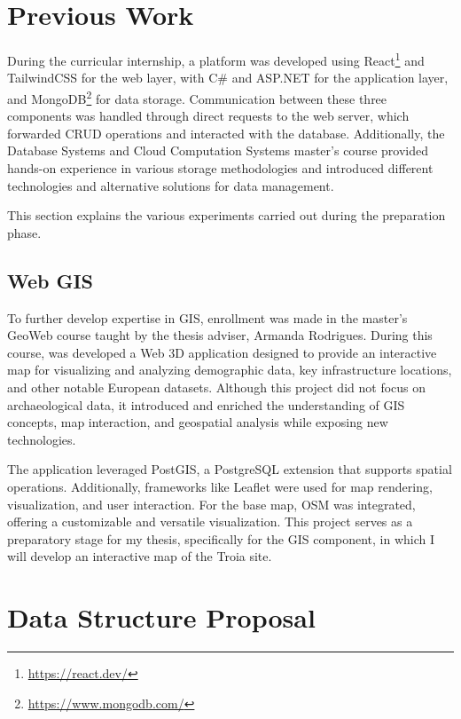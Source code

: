 \section{Previous Work}
\label{sec:previous_work}

During the curricular internship, a platform was developed using React\footnote{\url{https://react.dev/}} and TailwindCSS for the web layer, with C\# and ASP.NET for the application layer, and MongoDB\footnote{\url{https://www.mongodb.com/}} for data storage. Communication between these three components was handled through direct requests to the web server, which forwarded \gls{CRUD} operations and interacted with the database.  
Additionally, the Database Systems and Cloud Computation Systems master's course provided hands-on experience in various storage methodologies and introduced different technologies and alternative solutions for data management.

This section explains the various experiments carried out during the preparation phase.

\subsection{Web \gls{GIS}}
\label{sec:gis_previous} 

To further develop expertise in \gls{GIS}, enrollment was made in the master's GeoWeb course taught by the thesis adviser, Armanda Rodrigues. During this course, was developed a Web \gls{3D} application designed to provide an interactive map for visualizing and analyzing demographic data, key infrastructure locations, and other notable European datasets. Although this project did not focus on archaeological data, it introduced and enriched the understanding of GIS concepts, map interaction, and geospatial analysis while exposing new technologies.

The application leveraged PostGIS, a PostgreSQL extension that supports spatial operations.
Additionally, frameworks like Leaflet were used for map rendering, visualization, and user interaction. For the base map, \gls{OSM} was integrated, offering a customizable and versatile visualization. This project serves as a preparatory stage for my thesis, specifically for the \gls{GIS} component, in which I will develop an interactive map of the Troia site.

\section{Data Structure Proposal}
\label{sec:data_strucutre}

